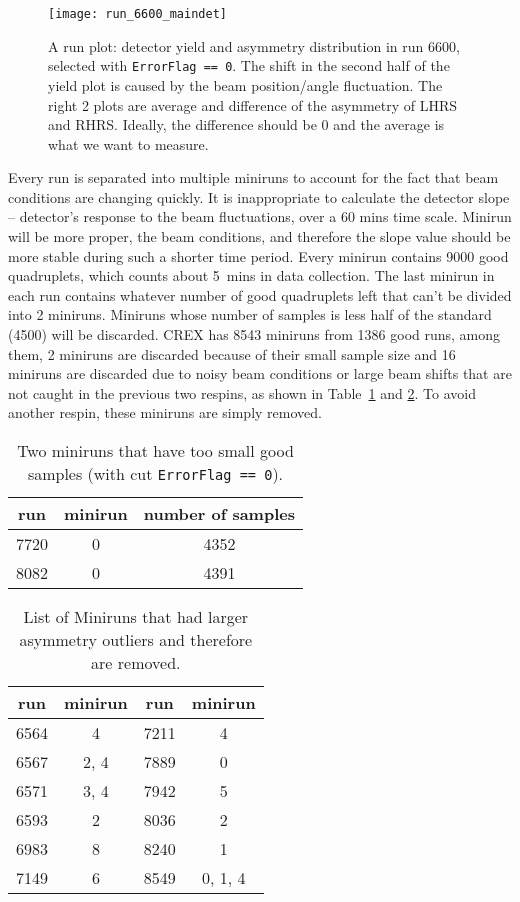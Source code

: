 \begin{figure}[!h]
    \centering
    \texttt{[image: run\_6600\_maindet]}
    \caption{A run plot: detector yield and asymmetry distribution in run 6600, 
    selected with \texttt{ErrorFlag == 0}. The shift in the second half of the 
    yield plot is caused by the beam position/angle fluctuation. 
    The right 2 plots are average and difference of the asymmetry of LHRS and RHRS. 
    Ideally, the difference should be 0 and the average is what we want to measure.
    }
\end{figure}

Every run is separated into multiple miniruns to account for the fact that beam
conditions are changing quickly. It is inappropriate to calculate the detector
slope -- detector's response to the beam fluctuations, over a 60 mins time scale. 
Minirun will be more proper, the beam conditions, and therefore
the slope value should be more stable during such a shorter time period.  
Every minirun contains 9000 good quadruplets, which counts about 5~mins
in data collection. The last minirun in each run contains 
whatever number of good quadruplets left that can't be divided into 2 miniruns. 
Miniruns whose number of samples is less half of the standard (4500) will be discarded.
CREX has 8543 miniruns from 1386 good runs, among them, 2 miniruns are discarded
because of their small sample size and 16 miniruns are discarded due to noisy beam conditions 
or large beam shifts that are not caught in the previous two respins, as shown
in Table~\ref{tab:short_miniruns} and \ref{tab:bad_miniruns}.
To avoid another respin, these miniruns are simply removed. %
\begin{table}[!h]
    \centering
    \begin{tabular}{c c c}
	\hline
	run & minirun	& number of samples \\
	\hline
	7720	& 0 & 4352  \\
	8082	& 0 & 4391  \\
	\hline
    \end{tabular}
    \caption{Two miniruns that have too small good samples (with cut \texttt{ErrorFlag == 0}).}
    \label{tab:short_miniruns}
\end{table}
\begin{table}[!h]
    \centering
    \begin{tabular}{c c | c c}
	\hline
	run & minirun	& run	& minirun   \\
	\hline
	6564	& 4	& 7211	& 4 \\
	6567	& 2, 4	& 7889	& 0 \\
	6571	& 3, 4	& 7942	& 5 \\
	6593	& 2	& 8036	& 2 \\
	6983	& 8	& 8240	& 1 \\
	7149	& 6	& 8549	& 0, 1, 4   \\
	\hline
    \end{tabular}
    \caption{List of Miniruns that had larger asymmetry outliers and therefore
    are removed.}
    \label{tab:bad_miniruns}
\end{table}
